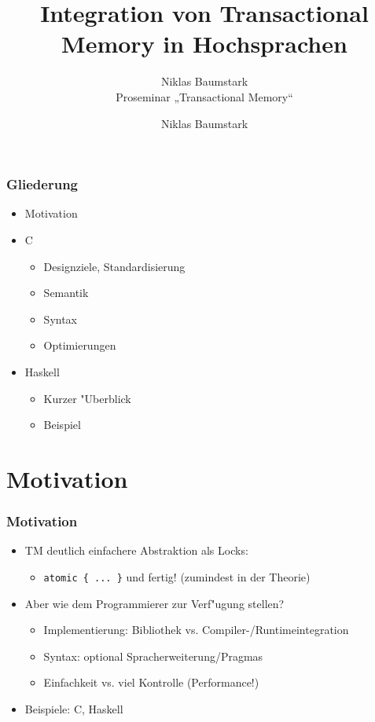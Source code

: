 \documentclass[t]{beamer}
\title[]{Integration von Transactional Memory in Hochsprachen}
\subtitle{
Niklas Baumstark\\
Proseminar „Transactional Memory“}
\author[]{Niklas Baumstark}
\institute[]{Lehrstuhl für Rechnerarchitektur und Parallelverarbeitung, Prof. Karl}
\newlength{\Ku}
\newcommand{\Rplus}{\protect\raisebox{.1ex}{+}}
\newcommand{\Cpp}{\mbox{C\Rplus\Rplus}\xspace}
\begin{document}
\begin{frame}
  \maketitle
\end{frame}

\begin{frame}
  \frametitle{Gliederung}
  \begin{itemize}
    \item Motivation
    \item \Cpp
      \begin{itemize}
      \item Designziele, Standardisierung
      \item Semantik
      \item Syntax
      \item Optimierungen
      \end{itemize}
    \item Haskell
      \begin{itemize}
      \item Kurzer "Uberblick
      \item Beispiel
      \end{itemize}
  \end{itemize}
\end{frame}

\section{Motivation}
\begin{frame}[fragile]
  \frametitle{Motivation}

  \begin{itemize}
  \item TM deutlich einfachere Abstraktion als Locks:
    \begin{itemize}
    \item \lstinline|atomic { ... }| und fertig! (zumindest in der Theorie)
    \end{itemize}
  \item Aber wie dem Programmierer zur Verf"ugung stellen?
    \begin{itemize}
    \item Implementierung: Bibliothek vs. Compiler-/Runtimeintegration
    \item Syntax: optional Spracherweiterung/Pragmas
    \item Einfachkeit vs. viel Kontrolle (Performance!)
    \end{itemize}
  \item Beispiele: \Cpp, Haskell
  \end{itemize}

\end{frame}
\end{document}
